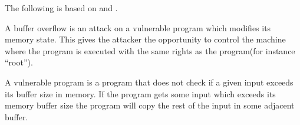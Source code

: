 The following is based on \citet[p. 18]{foster2005buffer} and \citet[Section 1.1]{ruwase2004practical}.

A buffer overflow is an attack on a vulnerable program which modifies its memory state.
This gives the attacker the opportunity to control the machine where the program is executed with the same rights as the program(for instance ``root'').

A vulnerable program is a program that does not check if a given input exceeds its buffer size in memory.
If the program gets some input which exceeds its memory buffer size the program will copy the rest of the input in some adjacent buffer.
